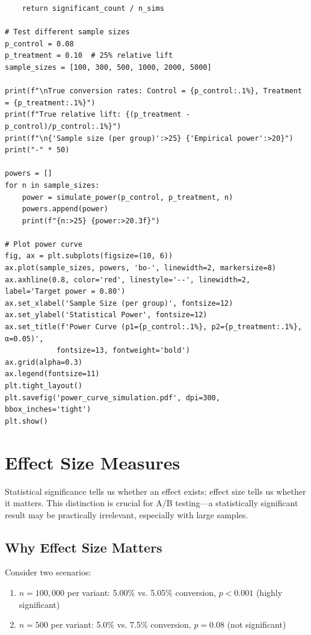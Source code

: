 \begin{lstlisting}
    return significant_count / n_sims

# Test different sample sizes
p_control = 0.08
p_treatment = 0.10  # 25% relative lift
sample_sizes = [100, 300, 500, 1000, 2000, 5000]

print(f"\nTrue conversion rates: Control = {p_control:.1%}, Treatment = {p_treatment:.1%}")
print(f"True relative lift: {(p_treatment - p_control)/p_control:.1%}")
print(f"\n{'Sample size (per group)':>25} {'Empirical power':>20}")
print("-" * 50)

powers = []
for n in sample_sizes:
    power = simulate_power(p_control, p_treatment, n)
    powers.append(power)
    print(f"{n:>25} {power:>20.3f}")

# Plot power curve
fig, ax = plt.subplots(figsize=(10, 6))
ax.plot(sample_sizes, powers, 'bo-', linewidth=2, markersize=8)
ax.axhline(0.8, color='red', linestyle='--', linewidth=2, label='Target power = 0.80')
ax.set_xlabel('Sample Size (per group)', fontsize=12)
ax.set_ylabel('Statistical Power', fontsize=12)
ax.set_title(f'Power Curve (p1={p_control:.1%}, p2={p_treatment:.1%}, α=0.05)',
            fontsize=13, fontweight='bold')
ax.grid(alpha=0.3)
ax.legend(fontsize=11)
plt.tight_layout()
plt.savefig('power_curve_simulation.pdf', dpi=300, bbox_inches='tight')
plt.show()
\end{lstlisting}

\section{Effect Size Measures}

Statistical significance tells us whether an effect exists; effect size tells us whether it matters. This distinction is crucial for A/B testing—a statistically significant result may be practically irrelevant, especially with large samples.

\subsection{Why Effect Size Matters}

Consider two scenarios:
\begin{enumerate}
    \item $n = 100,000$ per variant: 5.00\% vs. 5.05\% conversion, $p < 0.001$ (highly significant)
    \item $n = 500$ per variant: 5.0\% vs. 7.5\% conversion, $p = 0.08$ (not significant)
\end{enumerate}

